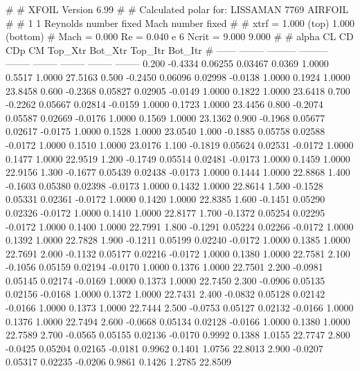 #  
#       XFOIL         Version 6.99
#  
# Calculated polar for: LISSAMAN 7769 AIRFOIL                           
#  
# 1 1 Reynolds number fixed          Mach number fixed         
#  
# xtrf =   1.000 (top)        1.000 (bottom)  
# Mach =   0.000     Re =     0.040 e 6     Ncrit =   9.000  9.000
#  
#   alpha    CL        CD       CDp       CM     Top_Xtr  Bot_Xtr  Top_Itr  Bot_Itr
#  ------ -------- --------- --------- -------- -------- -------- -------- --------
   0.200  -0.4334   0.06255   0.03467   0.0369   1.0000   0.5517   1.0000  27.5163
   0.500  -0.2450   0.06096   0.02998  -0.0138   1.0000   0.1924   1.0000  23.8458
   0.600  -0.2368   0.05827   0.02905  -0.0149   1.0000   0.1822   1.0000  23.6418
   0.700  -0.2262   0.05667   0.02814  -0.0159   1.0000   0.1723   1.0000  23.4456
   0.800  -0.2074   0.05587   0.02669  -0.0176   1.0000   0.1569   1.0000  23.1362
   0.900  -0.1968   0.05677   0.02617  -0.0175   1.0000   0.1528   1.0000  23.0540
   1.000  -0.1885   0.05758   0.02588  -0.0172   1.0000   0.1510   1.0000  23.0176
   1.100  -0.1819   0.05624   0.02531  -0.0172   1.0000   0.1477   1.0000  22.9519
   1.200  -0.1749   0.05514   0.02481  -0.0173   1.0000   0.1459   1.0000  22.9156
   1.300  -0.1677   0.05439   0.02438  -0.0173   1.0000   0.1444   1.0000  22.8868
   1.400  -0.1603   0.05380   0.02398  -0.0173   1.0000   0.1432   1.0000  22.8614
   1.500  -0.1528   0.05331   0.02361  -0.0172   1.0000   0.1420   1.0000  22.8385
   1.600  -0.1451   0.05290   0.02326  -0.0172   1.0000   0.1410   1.0000  22.8177
   1.700  -0.1372   0.05254   0.02295  -0.0172   1.0000   0.1400   1.0000  22.7991
   1.800  -0.1291   0.05224   0.02266  -0.0172   1.0000   0.1392   1.0000  22.7828
   1.900  -0.1211   0.05199   0.02240  -0.0172   1.0000   0.1385   1.0000  22.7691
   2.000  -0.1132   0.05177   0.02216  -0.0172   1.0000   0.1380   1.0000  22.7581
   2.100  -0.1056   0.05159   0.02194  -0.0170   1.0000   0.1376   1.0000  22.7501
   2.200  -0.0981   0.05145   0.02174  -0.0169   1.0000   0.1373   1.0000  22.7450
   2.300  -0.0906   0.05135   0.02156  -0.0168   1.0000   0.1372   1.0000  22.7431
   2.400  -0.0832   0.05128   0.02142  -0.0166   1.0000   0.1373   1.0000  22.7444
   2.500  -0.0753   0.05127   0.02132  -0.0166   1.0000   0.1376   1.0000  22.7494
   2.600  -0.0668   0.05134   0.02128  -0.0166   1.0000   0.1380   1.0000  22.7589
   2.700  -0.0565   0.05155   0.02136  -0.0170   0.9992   0.1388   1.0155  22.7747
   2.800  -0.0425   0.05204   0.02165  -0.0181   0.9962   0.1401   1.0756  22.8013
   2.900  -0.0207   0.05317   0.02235  -0.0206   0.9861   0.1426   1.2785  22.8509
